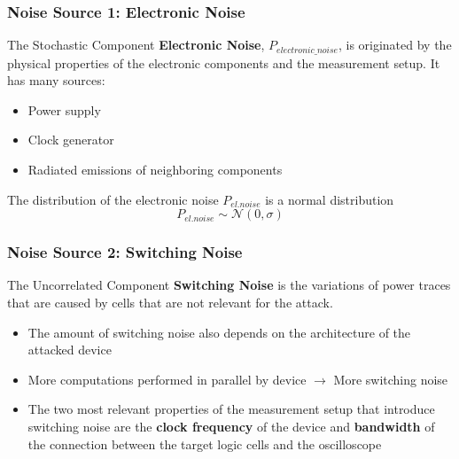 \begin{frame}
    \frametitle{Noise Source 1: Electronic Noise}

    \begin{block}{The Stochastic Component}
        \textbf{Electronic Noise}, $P_{electronic\_noise}$, is originated by the physical properties of the electronic components and the measurement setup.\newline
        It has many sources:
        
        \begin{itemize}
            \item Power supply
            \item Clock generator
            \item Radiated emissions of neighboring components
        \end{itemize}
    \end{block}
    \begin{alertblock}{}
        The distribution of the electronic noise $P_{el.noise}$ is a normal distribution
        $$P_{el.noise} \sim \mathcal{N(0, \sigma)}$$
    \end{alertblock}
\end{frame}

\begin{frame}
    \frametitle{Noise Source 2: Switching Noise}

    \begin{block}{The Uncorrelated Component}
        \textbf{Switching Noise} is the variations of power traces that are caused by cells that are not relevant for the attack. 
        
        \begin{itemize}
            \item The amount of switching noise also depends on the architecture of the attacked device
            \item More computations performed in parallel by device $\rightarrow$ More switching noise
            \item The two most relevant properties of the measurement setup that introduce switching noise are the \textbf{clock frequency }of the device and \textbf{bandwidth} of the connection between the target logic cells and the oscilloscope
        \end{itemize}
    \end{block}
\end{frame}

